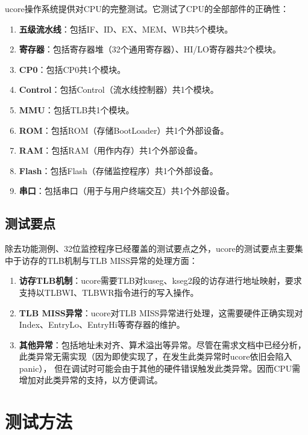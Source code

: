 
ucore操作系统提供对CPU的完整测试。它测试了CPU的全部部件的正确性：

\begin{enumerate}
    \item {\bf 五级流水线}：包括IF、ID、EX、MEM、WB共5个模块。
    \item {\bf 寄存器}：包括寄存器堆（32个通用寄存器）、HI/LO寄存器共2个模块。
    \item {\bf CP0}：包括CP0共1个模块。
    \item {\bf Control}：包括Control（流水线控制器）共1个模块。
    \item {\bf MMU}：包括TLB共1个模块。
    \item {\bf ROM}：包括ROM（存储BootLoader）共1个外部设备。
    \item {\bf RAM}：包括RAM（用作内存）共1个外部设备。
    \item {\bf Flash}：包括Flash（存储监控程序）共1个外部设备。
    \item {\bf 串口}：包括串口（用于与用户终端交互）共1个外部设备。
\end{enumerate}

\subsection{测试要点}

除去功能测例、32位监控程序已经覆盖的测试要点之外，ucore的测试要点主要集中于访存的TLB机制与TLB MISS异常的处理方面：

\begin{enumerate}
    \item {\bf 访存TLB机制}：ucore需要TLB对kuseg、kseg2段的访存进行地址映射，要求支持以TLBWI、TLBWR指令进行的写入操作。
    \item {\bf TLB MISS异常}：ucore对TLB MISS异常进行处理，这需要硬件正确实现对Index、EntryLo、EntryHi等寄存器的维护。
    \item {\bf 其他异常}：包括地址未对齐、算术溢出等异常。尽管在需求文档中已经分析，此类异常无需实现（因为即使实现了，在发生此类异常时ucore依旧会陷入panic），
    但在调试时可能会由于其他的硬件错误触发此类异常。因而CPU需增加对此类异常的支持，以方便调试。
\end{enumerate}

\section{测试方法}

